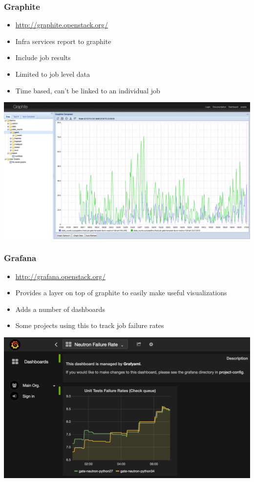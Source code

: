 \documentclass[aspectratio=169,11pt,hyperref={colorlinks=true}]{beamer}
\begin{document}
\begin{frame}
  \frametitle{Graphite}
  \begin{itemize}
    \item \href{http://graphite.openstack.org/}{http://graphite.openstack.org/}
    \item Infra services report to graphite
    \item Include job results
    \item Limited to job level data
    \item Time based, can't be linked to an individual job
  \end{itemize}
  \begin{center}
    \includegraphics[width=.65\textwidth]{graphite-sample.png}
  \end{center}
\end{frame}

\begin{frame}
  \frametitle{Grafana}
  \begin{itemize}
    \item \href{http://grafana.openstack.org/}{http://grafana.openstack.org/}
    \item Provides a layer on top of graphite to easily make useful visualizations
    \item Adds a number of dashboards
    \item Some projects using this to track job failure rates
  \end{itemize}
  \begin{center}
    \includegraphics[width=.7\textwidth]{grafana-sample.png}
  \end{center}
\end{frame}
\end{document}
